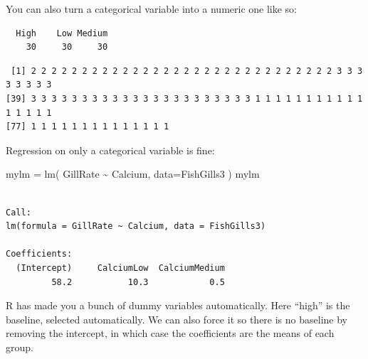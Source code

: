 \documentclass[
  letterpaper,
  DIV=11,
  numbers=noendperiod]{scrreprt}
\newenvironment{Shaded}{\begin{snugshade}}{\end{snugshade}}
\newcommand{\AttributeTok}[1]{\textcolor[rgb]{0.49,0.56,0.16}{#1}}
\newcommand{\FunctionTok}[1]{\textcolor[rgb]{0.02,0.16,0.49}{#1}}
\newcommand{\NormalTok}[1]{\textcolor[rgb]{0.00,0.44,0.13}{#1}}
\newcommand{\OtherTok}[1]{\textcolor[rgb]{0.00,0.44,0.13}{#1}}
\newcommand{\SpecialCharTok}[1]{\textcolor[rgb]{0.25,0.44,0.63}{#1}}
\begin{document}
You can also turn a categorical variable into a numeric one like so:

\begin{Shaded}
\end{Shaded}

\begin{verbatim}
  High    Low Medium 
    30     30     30 
\end{verbatim}

\begin{Shaded}
\end{Shaded}

\begin{verbatim}
 [1] 2 2 2 2 2 2 2 2 2 2 2 2 2 2 2 2 2 2 2 2 2 2 2 2 2 2 2 2 2 2 3 3 3 3 3 3 3 3
[39] 3 3 3 3 3 3 3 3 3 3 3 3 3 3 3 3 3 3 3 3 3 3 1 1 1 1 1 1 1 1 1 1 1 1 1 1 1 1
[77] 1 1 1 1 1 1 1 1 1 1 1 1 1 1
\end{verbatim}

Regression on only a categorical variable is fine:

\begin{Shaded}
\begin{Highlighting}[]
\NormalTok{mylm }\OtherTok{=} \FunctionTok{lm}\NormalTok{( GillRate }\SpecialCharTok{\textasciitilde{}}\NormalTok{ Calcium, }\AttributeTok{data=}\NormalTok{FishGills3 )}
\NormalTok{mylm}
\end{Highlighting}
\end{Shaded}

\begin{verbatim}

Call:
lm(formula = GillRate ~ Calcium, data = FishGills3)

Coefficients:
  (Intercept)     CalciumLow  CalciumMedium  
         58.2           10.3            0.5  
\end{verbatim}

R has made you a bunch of dummy variables automatically. Here ``high''
is the baseline, selected automatically. We can also force it so there
is no baseline by removing the intercept, in which case the coefficients
are the means of each group.
\end{document}
